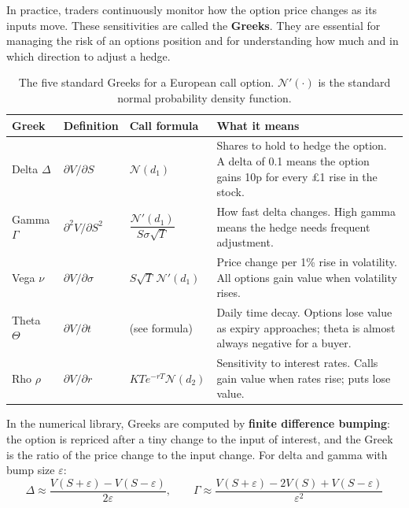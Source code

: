 \documentclass[12pt]{article}
\begin{document}
In practice, traders continuously monitor how the option price changes as its inputs
move. These sensitivities are called the \textbf{Greeks}. They are essential for
managing the risk of an options position and for understanding how much and in which
direction to adjust a hedge.

\begin{table}[H]
  \centering
  \caption{The five standard Greeks for a European call option.
    $\mathcal{N}'(\cdot)$ is the standard normal probability density function.}
  \label{tab:greeks}
  \begin{tabular}{L{1.8cm} C{2.2cm} C{4.2cm} L{5cm}}
    \toprule
    \textbf{Greek} & \textbf{Definition} & \textbf{Call formula} & \textbf{What it means} \\
    \midrule
    Delta $\Delta$ & $\partial V/\partial S$ & $\mathcal{N}(d_1)$ &
      Shares to hold to hedge the option. A delta of 0.1 means the option gains
      10p for every \pounds1 rise in the stock. \\[4pt]
    Gamma $\Gamma$ & $\partial^2 V/\partial S^2$ & $\dfrac{\mathcal{N}'(d_1)}{S\sigma\sqrt{T}}$ &
      How fast delta changes. High gamma means the hedge needs frequent adjustment. \\[8pt]
    Vega $\nu$ & $\partial V/\partial\sigma$ & $S\sqrt{T}\,\mathcal{N}'(d_1)$ &
      Price change per 1\% rise in volatility. All options gain value when
      volatility rises. \\[4pt]
    Theta $\Theta$ & $\partial V/\partial t$ & (see formula) &
      Daily time decay. Options lose value as expiry approaches; theta is almost
      always negative for a buyer. \\[4pt]
    Rho $\rho$ & $\partial V/\partial r$ & $KTe^{-rT}\mathcal{N}(d_2)$ &
      Sensitivity to interest rates. Calls gain value when rates rise; puts lose value. \\
    \bottomrule
  \end{tabular}
\end{table}

In the numerical library, Greeks are computed by \textbf{finite difference bumping}:
the option is repriced after a tiny change to the input of interest, and the Greek
is the ratio of the price change to the input change. For delta and gamma with bump
size $\varepsilon$:
\begin{equation}
  \Delta \approx \frac{V(S+\varepsilon) - V(S-\varepsilon)}{2\varepsilon}, \qquad
  \Gamma \approx \frac{V(S+\varepsilon) - 2V(S) + V(S-\varepsilon)}{\varepsilon^2}
\end{equation}
\newpage
\end{document}
